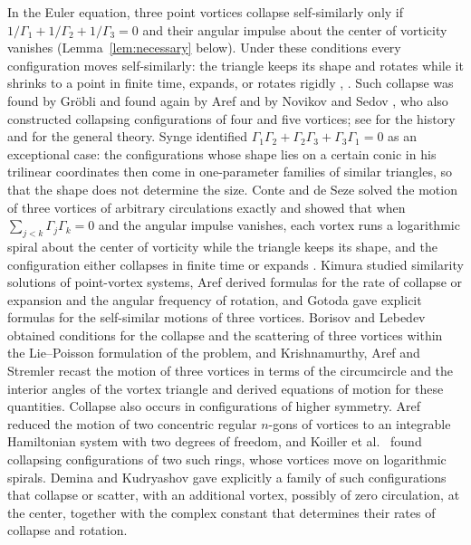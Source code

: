\documentclass[11pt]{article}
\theoremstyle{definition}
\begin{document}
In the Euler equation, three point vortices collapse self-similarly only if $1/\Gamma_1 + 1/\Gamma_2 + 1/\Gamma_3 = 0$ and their angular impulse about the center of vorticity vanishes (Lemma~\ref{lem:necessary} below). Under these conditions every configuration moves self-similarly: the triangle keeps its shape and rotates while it shrinks to a point in finite time, expands, or rotates rigidly \cite[Sect.~4.5.2]{gallay2026}, \cite{kas2018}. Such collapse was found by Gr\"obli \cite{grobli1877} and found again by Aref \cite{aref1979} and by Novikov and Sedov \cite{ns1979}, who also constructed collapsing configurations of four and five vortices; see \cite[p.~17, Fig.~3]{art1992} for the history and \cite{newton2001} for the general theory. Synge \cite[Sect.~4, Theorem~8]{synge1949} identified $\Gamma_1\Gamma_2 + \Gamma_2\Gamma_3 + \Gamma_3\Gamma_1 = 0$ as an exceptional case: the configurations whose shape lies on a certain conic in his trilinear coordinates then come in one-parameter families of similar triangles, so that the shape does not determine the size. Conte and de Seze \cite{cds1980} solved the motion of three vortices of arbitrary circulations exactly and showed that when $\sum_{j<k} \Gamma_j \Gamma_k = 0$ and the angular impulse vanishes, each vortex runs a logarithmic spiral about the center of vorticity while the triangle keeps its shape, and the configuration either collapses in finite time or expands \cite[Sect.~4]{cds1980}. Kimura \cite{kimura1987} studied similarity solutions of point-vortex systems, Aref \cite{aref2010} derived formulas for the rate of collapse or expansion and the angular frequency of rotation, and Gotoda \cite{gotoda2021} gave explicit formulas for the self-similar motions of three vortices. Borisov and Lebedev \cite{bl1998} obtained conditions for the collapse and the scattering of three vortices within the Lie--Poisson formulation of the problem, and Krishnamurthy, Aref and Stremler \cite{kas2018} recast the motion of three vortices in terms of the circumcircle and the interior angles of the vortex triangle and derived equations of motion for these quantities. Collapse also occurs in configurations of higher symmetry. Aref \cite{aref1982} reduced the motion of two concentric regular $n$-gons of vortices to an integrable Hamiltonian system with two degrees of freedom, and Koiller et al.\ \cite{koiller1985} found collapsing configurations of two such rings, whose vortices move on logarithmic spirals. Demina and Kudryashov \cite[Sect.~3]{dk2014} gave explicitly a family of such configurations that collapse or scatter, with an additional vortex, possibly of zero circulation, at the center, together with the complex constant that determines their rates of collapse and rotation.
\end{document}
